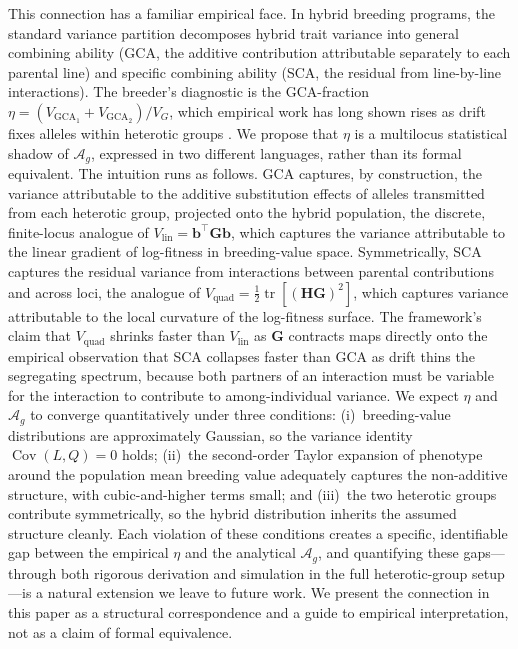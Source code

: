 \documentclass[9pt,twocolumn,twoside,lineno]{gsajnl}
\newcommand{\vect}[1]{\boldsymbol{#1}}
\newcommand{\mat}[1]{\mathbf{#1}}
\newcommand{\tr}{\ensuremath{\operatorname{tr}}\xspace}
\newcommand{\Ag}{\ensuremath{\mathcal{A}_{g}}\xspace}
\newcommand{\Vlin}{\ensuremath{V_{\text{lin}}}\xspace}
\newcommand{\Vquad}{\ensuremath{V_{\text{quad}}}\xspace}
\newcommand{\Cov}{\ensuremath{\operatorname{Cov}}\xspace}
\begin{document}
This connection has a familiar empirical face. In hybrid breeding programs, the standard variance partition decomposes hybrid trait variance into general combining ability (GCA, the additive contribution attributable separately to each parental line) and specific combining ability (SCA, the residual from line-by-line interactions). The breeder's diagnostic is the GCA-fraction $\eta = (V_{\mathrm{GCA}_1} + V_{\mathrm{GCA}_2})/V_G$, which empirical work has long shown rises as drift fixes alleles within heterotic groups \citep{Technow2021}. We propose that $\eta$ is a multilocus statistical shadow of \Ag, expressed in two different languages, rather than its formal equivalent. The intuition runs as follows. GCA captures, by construction, the variance attributable to the additive substitution effects of alleles transmitted from each heterotic group, projected onto the hybrid population, the discrete, finite-locus analogue of $\Vlin = \vect{b}^\top \mat{G} \vect{b}$, which captures the variance attributable to the linear gradient of log-fitness in breeding-value space. Symmetrically, SCA captures the residual variance from interactions between parental contributions and across loci, the analogue of $\Vquad = \tfrac{1}{2}\tr[(\mat{H}\mat{G})^2]$, which captures variance attributable to the local curvature of the log-fitness surface. The framework's claim that $\Vquad$ shrinks faster than $\Vlin$ as $\mat{G}$ contracts maps directly onto the empirical observation that SCA collapses faster than GCA as drift thins the segregating spectrum, because both partners of an interaction must be variable for the interaction to contribute to among-individual variance. We expect $\eta$ and \Ag to converge quantitatively under three conditions: (i)~breeding-value distributions are approximately Gaussian, so the variance identity $\Cov(L,Q)=0$ holds; (ii)~the second-order Taylor expansion of phenotype around the population mean breeding value adequately captures the non-additive structure, with cubic-and-higher terms small; and (iii)~the two heterotic groups contribute symmetrically, so the hybrid distribution inherits the assumed structure cleanly. Each violation of these conditions creates a specific, identifiable gap between the empirical $\eta$ and the analytical \Ag, and quantifying these gaps---through both rigorous derivation and simulation in the full heterotic-group setup---is a natural extension we leave to future work. We present the connection in this paper as a structural correspondence and a guide to empirical interpretation, not as a claim of formal equivalence.
\end{document}
